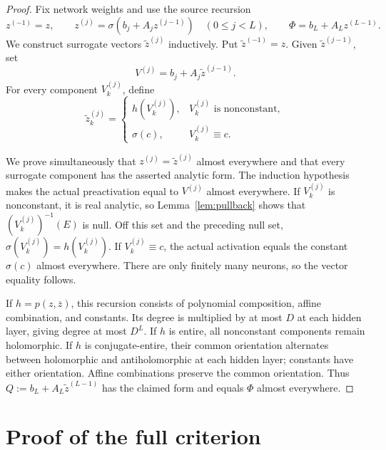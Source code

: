 \documentclass[11pt]{article}
\theoremstyle{remark}
\begin{document}
\begin{proof}
Fix network weights and use the source recursion
\[
 z^{(-1)}=z,\qquad
 z^{(j)}=\sigma(b_j+A_jz^{(j-1)})\quad(0\le j<L),
 \qquad
 \Phi=b_L+A_Lz^{(L-1)}.
\]
We construct surrogate vectors $\widetilde z^{(j)}$ inductively.  Put
$\widetilde z^{(-1)}=z$.  Given $\widetilde z^{(j-1)}$, set
\[
 V^{(j)}=b_j+A_j\widetilde z^{(j-1)}.
\]
For every component $V^{(j)}_k$, define
\[
 \widetilde z^{(j)}_k=
 \begin{cases}
 h(V^{(j)}_k),&V^{(j)}_k\text{ is nonconstant},\\
 \sigma(c),&V^{(j)}_k\equiv c.
 \end{cases}
\]

We prove simultaneously that $z^{(j)}=\widetilde z^{(j)}$ almost everywhere
and that every surrogate component has the asserted analytic form.  The
induction hypothesis makes the actual preactivation equal to $V^{(j)}$
almost everywhere.  If $V^{(j)}_k$ is nonconstant, it is real analytic, so
Lemma~\ref{lem:pullback} shows that
$(V^{(j)}_k)^{-1}(E)$ is null.  Off this set and the preceding null set,
$\sigma(V^{(j)}_k)=h(V^{(j)}_k)$.  If $V^{(j)}_k\equiv c$, the actual
activation equals the constant $\sigma(c)$ almost everywhere.  There are
only finitely many neurons, so the vector equality follows.

If $h=p(z,\overline z)$, this recursion consists of polynomial composition,
affine combination, and constants.  Its degree is multiplied by at most $D$
at each hidden layer, giving degree at most $D^L$.  If $h$ is entire, all
nonconstant components remain holomorphic.  If $h$ is conjugate-entire, their
common orientation alternates between holomorphic and antiholomorphic at each
hidden layer; constants have either orientation.  Affine combinations
preserve the common orientation.  Thus
$Q:=b_L+A_L\widetilde z^{(L-1)}$ has the claimed form and equals $\Phi$
almost everywhere.
\end{proof}

\section{Proof of the full criterion}
\end{document}
